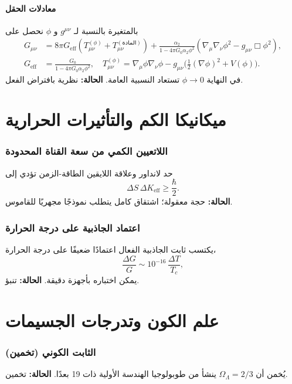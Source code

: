 \documentclass[11pt,a4paper]{article}
\begin{document}
	\subsection{معادلات الحقل}
	بالمتغيرة بالنسبة لـ \(g^{\mu\nu}\) و \(\phi\) نحصل على
	\begin{align}
		G_{\mu\nu} &= 8\pi G_{\mathrm{eff}}\left(T_{\mu\nu}^{(\phi)} + T_{\mu\nu}^{(\text{المادة})}\right) + \frac{\alpha_2}{1-4\pi G_0\alpha_2\phi^2}\left(\nabla_\mu\nabla_\nu\phi^2 - g_{\mu\nu}\Box\phi^2\right), \label{eq:einstein-mod} \\
		G_{\mathrm{eff}} &= \frac{G_0}{1-4\pi G_0\alpha_2\phi^2},\quad
		T_{\mu\nu}^{(\phi)} = \nabla_\mu\phi\nabla_\nu\phi - g_{\mu\nu}\bigl(\tfrac12(\nabla\phi)^2 + V(\phi)\bigr).
	\end{align}
	في النهاية \(\phi\to0\) تستعاد النسبية العامة. \textbf{الحالة:} نظرية بافتراض الفعل.
	
	\part{ميكانيكا الكم والتأثيرات الحرارية}
	
	\section{اللاتعيين الكمي من سعة القناة المحدودة}
	حد لانداور وعلاقة اللايقين الطاقة-الزمن تؤدي إلى
	\[
	\Delta S \, \Delta K_{\mathrm{eff}} \ge \frac{\hbar}{2}.
	\]
	\textbf{الحالة:} حجة معقولة؛ اشتقاق كامل يتطلب نموذجًا مجهريًا للقاموس.
	
	\section{اعتماد الجاذبية على درجة الحرارة}
	\label{sec:temperature}
	يكتسب ثابت الجاذبية الفعال اعتمادًا ضعيفًا على درجة الحرارة،
	\[
	\frac{\Delta G}{G} \sim 10^{-16}\,\frac{\Delta T}{T_c},
	\]
	يمكن اختباره بأجهزة دقيقة. \textbf{الحالة:} تنبؤ.
	
	\part{علم الكون وتدرجات الجسيمات}
	
	\section{الثابت الكوني (تخمين)}
	\label{sec:Lambda}
	يُخمن أن \(\Omega_\Lambda = 2/3\) ينشأ من طوبولوجيا الهندسة الأولية ذات 19 بعدًا. \textbf{الحالة:} تخمين.
	
\end{document}
